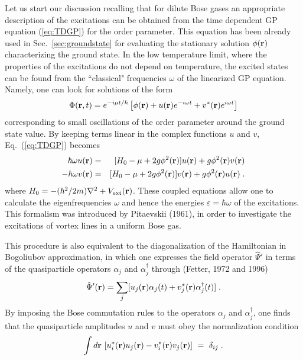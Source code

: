 Let us start our discussion recalling that for dilute Bose gases
an appropriate description of the  excitations can be
obtained from the time dependent GP equation (\ref{eq:TDGP}) for
the order parameter. This equation  has been already used in
Sec.~\ref{sec:groundstate} for  evaluating the stationary
solution  $\phi({\bf r})$ characterizing the ground state. 
In the low temperature limit, where the
properties of the excitations do not depend on temperature, the
excited states can be found from the ``classical" frequencies
$\omega$ of the linearized GP equation. Namely, one can look for
solutions of the form
\begin{equation}
\Phi ({\bf r},t) = e^{-i\mu t/\hbar} \left[ \phi ({\bf r}) + 
u({\bf r}) e^{-i \omega t} + v^*({\bf r}) e^{i \omega t} \right]
\label{eq:linearized}
\end{equation}
corresponding to small oscillations of the order parameter around
the ground state value. By keeping  terms linear in the complex
functions $u$ and $v$, Eq.~(\ref{eq:TDGP}) becomes 
\begin{eqnarray}
 \hbar \omega u({\bf r}) &=& [ H_0 - \mu + 2 g \phi^2({\bf r})]
u ({\bf r}) + g  \phi^2({\bf r}) v ({\bf r})
\label{eq:coupled1}
\\
- \hbar \omega v({\bf r}) &=& [ H_0 - \mu + 2 g \phi^2({\bf r})] 
v ({\bf r}) + g  \phi^2({\bf r}) u ({\bf r}) \; .
\label{eq:coupled2}
\end{eqnarray}
where $H_0= - (\hbar^2/2m) \nabla^2 +  V_{\rm ext}({\bf r})$. These 
coupled equations allow one to calculate the eigenfrequencies $\omega$ 
and hence the energies $\varepsilon= \hbar \omega$ of the excitations.
This formalism was introduced by Pitaevskii (1961), in order to 
investigate the excitations of vortex lines in a uniform Bose gas.

This procedure is also equivalent to the diagonalization of the
Hamiltonian in Bogoliubov approximation, in which one expresses
the field operator $\hat\Psi'$ in terms of the quasiparticle
operators $\alpha_j$ and $\alpha_j^\dagger$ through (Fetter, 1972
and 1996)
\begin{equation}
\hat\Psi' ({\bf r})  = \sum_j [ u_j({\bf r}) \alpha_j(t)
+ v_j^*({\bf r}) \alpha_j^\dagger(t) ] \; .
\label{eq:tildepsilinearized}
\end{equation}
By imposing the Bose commutation rules to the operators $\alpha_j$
and $\alpha_j^\dagger$,  one finds that the quasiparticle amplitudes
$u$ and $v$ must obey the normalization condition
\begin{equation}
\int d{\bf r} \ [ u_i^*({\bf r}) u_j({\bf r}) -
v_i^*({\bf r}) v_j({\bf r}) ] \ = \ \delta_{ij} \; .
\label{eq:normalizationuandv}
\end{equation}

